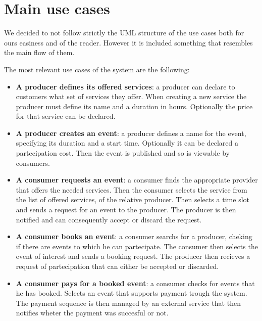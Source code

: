 \documentclass{article}
\begin{document}
\section{Main use cases}

We decided to not follow strictly the UML structure of the use cases both for ours
easiness and of the reader. However it is included something that resembles the
main flow of them.

The most relevant use cases of the system are the following:

\begin{itemize}
	\item \textbf{A producer defines its offered services}: a producer can
		declare to customers what set of services they offer. When creating
		a new service the producer must define its name and a duration in
		hours. Optionally the price for that service can be declared.
	\item \textbf{A producer creates an event}: a producer defines a name
		for the event, specifying its duration and a start time. 
		Optionally it can be declared a partecipation cost. Then the
		event is published and so is viewable by consumers.
	\item \textbf{A consumer requests an event}: a consumer finds the
		appropriate provider that offers the needed services. Then
		the consumer selects the service from the list of offered services,
		of the relative producer. Then selects a time slot and sends a 
		request for an event to the producer. The producer is then notified
		and can consequently accept or discard the request.
	\item \textbf{A consumer books an event}: a consumer searchs for a producer,
		cheking if there are events to which he can partecipate.
		The consumer then selects the event of interest and sends a
		booking request. The producer then recieves a request of
		partecipation that can either be accepted or discarded.
	\item \textbf{A consumer pays for a booked event}: a consumer checks for events
		that he has booked. Selects an event that supports payment
		trough the system. The payment sequence is then managed by an
		external service that then notifies wheter the payment was
		succesful or not.
\end{itemize}
\end{document}
